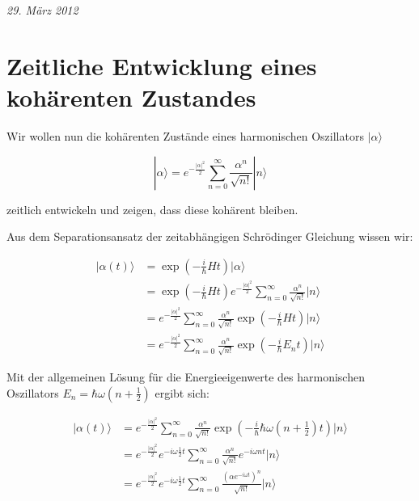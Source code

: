 



\textit{29. März 2012}

\section*{Zeitliche Entwicklung eines kohärenten Zustandes}

Wir wollen nun die kohärenten Zustände eines harmonischen Oszillators \(|\alpha\rangle \) 

\begin{equation}
  \label{eq:1}
  |\alpha\rangle =  e^{-\frac{|\alpha|^2}{2}} \sum_{n=0}^{\infty} \frac{\alpha^n}{\sqrt{n!}} |n\rangle
\end{equation}

zeitlich entwickeln und zeigen, dass diese kohärent bleiben. 

Aus dem Separationsansatz der zeitabhängigen Schrödinger Gleichung wissen wir:

\begin{align}
  \label{eq:2}
  |\alpha (t)\rangle  &= \exp\left( -\frac{i}{\hbar}Ht\right)|\alpha\rangle \\
 &= \exp\left( -\frac{i}{\hbar}Ht\right)e^{-\frac{|\alpha|^2}{2}} \sum_{n=0}^{\infty} \frac{\alpha^n}{\sqrt{n!}} |n\rangle \\
 &=e^{-\frac{|\alpha|^2}{2}}  \sum_{n=0}^{\infty} \frac{\alpha^n}{\sqrt{n!}} \exp\left( -\frac{i}{\hbar}Ht\right) |n\rangle \\
 &=  e^{-\frac{|\alpha|^2}{2}}  \sum_{n=0}^{\infty} \frac{\alpha^n}{\sqrt{n!}} \exp\left( -\frac{i}{\hbar}E_n t\right)  |n\rangle 
\end{align}

Mit der allgemeinen Lösung für die Energieeigenwerte des harmonischen Oszillators \(E_n= \hbar\omega(n+\frac{1}{2})\) ergibt sich:


\begin{align}
  |\alpha (t)\rangle  &= e^{-\frac{|\alpha|^2}{2}}  \sum_{n=0}^{\infty} \frac{\alpha^n}{\sqrt{n!}} \exp\left( -\frac{i}{\hbar}\hbar\omega(n+\frac{1}{2})  t\right)  |n\rangle \\
&= e^{-\frac{|\alpha|^2}{2}}e^{-i\omega\frac{1}{2}t}  \sum_{n=0}^{\infty} \frac{\alpha^n}{\sqrt{n!}} e^{ -i\omega n t}  |n\rangle \\
&= e^{-\frac{|\alpha|^2}{2}}e^{-i\omega\frac{1}{2}t}  \sum_{n=0}^{\infty} \frac{\left( \alpha e^{ -i\omega  t}\right)^n }{\sqrt{n!}}   |n\rangle  \label{eq:3}
\end{align}


